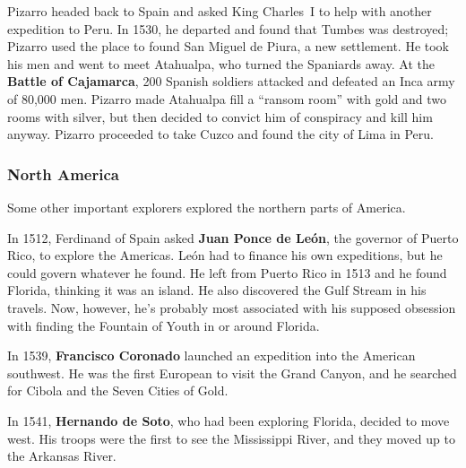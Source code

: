 Pizarro headed back to Spain and asked King Charles~I to help with another expedition to Peru.
In 1530, he departed and found that Tumbes was destroyed;
Pizarro used the place to found San Miguel de Piura, a new settlement.
He took his men and went to meet Atahualpa, who turned the Spaniards away.
At the \textbf{Battle of Cajamarca},
200 Spanish soldiers attacked and defeated an Inca army of 80,000 men.
Pizarro made Atahualpa fill a ``ransom room'' with gold and two rooms with silver,
but then decided to convict him of conspiracy and kill him anyway.
Pizarro proceeded to take Cuzco and found the city of Lima in Peru.

\subsubsection*{North America}

Some other important explorers explored the northern parts of America.

In 1512, Ferdinand of Spain asked \textbf{Juan Ponce de Le\'on},
the governor of Puerto Rico, to explore the Americas.
Le\'on had to finance his own expeditions, but he could govern whatever he found.
He left from Puerto Rico in 1513 and he found Florida, thinking it was an island.
He also discovered the Gulf Stream in his travels.
Now, however, he's probably most associated with his supposed obsession
with finding the Fountain of Youth in or around Florida.

In 1539, \textbf{Francisco Coronado} launched an expedition into the American southwest.
He was the first European to visit the Grand Canyon,
and he searched for Cibola and the Seven Cities of Gold.

In 1541, \textbf{Hernando de Soto}, who had been exploring Florida, decided to move west.
His troops were the first to see the Mississippi River, and they moved up to the Arkansas River.
